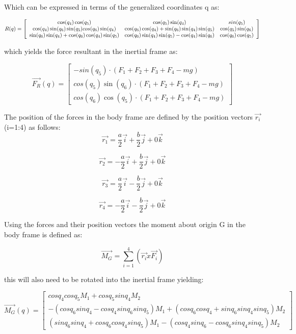 \documentclass[10pt, letterpaper]{article}
\begin{document}
Which can be expressed in terms of the generalized coordinates q as:

\[
R(q)=\left[\begin{array}{ccc}
\cos(q_{4})\cos(q_{5}) & \cos(q_{5})\sin(q_{4}) & \-sin(q_{5})\\
\cos(q_{4})\sin(q_{6})\sin(q_{5})\-cos(q_{6})\sin(q_{4}) & \cos(q_{6})\cos(q_{4})+\sin(q_{6})\sin(q_{4})\sin(q_{5}) & \cos(q_{5})\sin(q_{6})\\
\sin(q_{6})\sin(q_{4})+\cos(q_{6})\cos(q_{4})\sin(q_{5}) & \cos(q_{6})\sin(q_{4})\sin(q_{5})-\cos(q_{4})\sin(q_{6}) & \cos(q_{6})\cos(q_{5})
\end{array}\right]\]

which yields the force resultant in the inertial frame as:

\[
\overrightarrow{F_{R}}(q)=\left[\begin{array}{c}
-sin(q_{5})\cdot(F_{1}+F_{2}+F_{3}+F_{4}-mg)\\
cos(q_{5})\sin(q_{6})\cdot(F_{1}+F_{2}+F_{3}+F_{4}-mg)\\
cos(q_{6})\cos(q_{5})\cdot(F_{1}+F_{2}+F_{3}+F_{4}-mg)
\end{array}\right]
\]

The position of the forces in the body frame are defined by the position
vectors $\overrightarrow{r_{i}}$ (i=1:4) as follows:
\[
\overrightarrow{r_{1}}=\frac{a}{2}\overrightarrow{i}+\frac{b}{2}\overrightarrow{j}+0\overrightarrow{k}
\]

\[
\overrightarrow{r_{2}}=-\frac{a}{2}\overrightarrow{i}+\frac{b}{2}\overrightarrow{j}+0\overrightarrow{k}
\]

\[
\overrightarrow{r_{3}}=\frac{a}{2}\overrightarrow{i}-\frac{b}{2}\overrightarrow{j}+0\overrightarrow{k}
\]

\[
\overrightarrow{r_{4}}=-\frac{a}{2}\overrightarrow{i}-\frac{b}{2}\overrightarrow{j}+0\overrightarrow{k}
\]

Using the forces and their position vectors the moment about origin
G in the body frame is defined as:

\[
\overrightarrow{M_{G}}=\sum_{i=1}^{4}(\overrightarrow{r_{i}}x\overrightarrow{F_{i}})
\]

this will also need to be rotated into the inertial frame yielding:

\[
\overrightarrow{M_{G}}(q)=\left[\begin{array}{c}
cosq_{4}cosq_{5}M_{1}+cosq_{5}sinq_{4}M_{2}\\
-(cosq_{6}sinq_{4}-cosq_{4}sinq_{6}sinq_{5})M_{1}+(cosq_{6}cosq_{4}+sinq_{6}sinq_{4}sinq_{5})M_{2}\\
(sinq_{6}sinq_{4}+cosq_{6}cosq_{4}sinq_{5})M_{1}-(cosq_{4}sinq_{6}-cosq_{6}sinq_{4}sinq_{5})M_{2}
\end{array}\right]
\]
\end{document}

